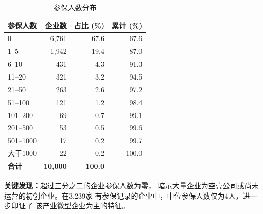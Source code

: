 \documentclass[12pt,a4paper]{article}
\newcommand{\tableHeaderRow}{\rowcolor{tealPrimary}\color{white}}
\newcommand{\tableOddRow}{\rowcolor{mintBG}}
\newcommand{\tableEvenRow}{\rowcolor{white}}
\begin{document}
\begin{table}[H]
\centering
\caption{参保人数分布}
\label{tab:insurance}
\begin{tabular}{lrrr}
\toprule
\tableHeaderRow
\textbf{参保人数} & \textbf{企业数} & \textbf{占比 (\%)} & \textbf{累计 (\%)} \\
\midrule
\tableOddRow  0           & 6,761 & 67.6 & 67.6  \\
\tableEvenRow 1--5        & 1,942 & 19.4 & 87.0  \\
\tableOddRow  6--10       & 431   & 4.3  & 91.3  \\
\tableEvenRow 11--20      & 321   & 3.2  & 94.5  \\
\tableOddRow  21--50      & 263   & 2.6  & 97.2  \\
\tableEvenRow 51--100     & 121   & 1.2  & 98.4  \\
\tableOddRow  101--200    & 69    & 0.7  & 99.1  \\
\tableEvenRow 201--500    & 53    & 0.5  & 99.6  \\
\tableOddRow  501--1000   & 17    & 0.2  & 99.7  \\
\tableEvenRow 大于1000    & 22    & 0.2  & 100.0 \\
\midrule
\tableOddRow  \textbf{合计} & \textbf{10,000} & \textbf{100.0} & --- \\
\bottomrule
\end{tabular}
\end{table}

\textbf{关键发现：}超过三分之二的企业参保人数为零，
暗示大量企业为空壳公司或尚未运营的初创企业。在3,239家
有参保记录的企业中，中位参保人数仅为4人，进一步印证了
该产业微型企业为主的特征。
\end{document}
